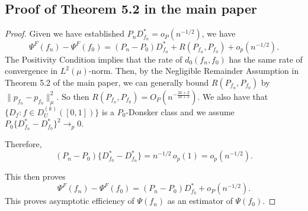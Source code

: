 \subsection{Proof of Theorem 5.2 in the main paper}
\begin{proof}
Given we have established $P_n D^*_{f_n}=o_P(n^{-1/2})$, we have
\[
\Psi^F(f_n)-\Psi^F(f_0)=(P_n-P_0)D^*_{f_n}+R(P_{f_n},P_{f_0})+o_p(n^{-1/2}).\]
The Positivity Condition implies that the rate of $d_0(f_n,f_0)$ has the same rate of convergence in $L^2(\mu)$-norm. Then, by the Negligible Remainder Assumption in Theorem 5.2 of the main paper, we can generally bound $R(P_{f_n},P_{f_0})$ by $\| p_{f_n}-p_{f_0}\|^2_{\mu}$.
So then $R(P_{f_n},P_{f_0})=O_P(n^{-\frac{2k+2}{2k+3}})$.
We also have that $\{D_f: f\in D^{(k)}_U([0,1])\}$ is a $P_0$-Donsker class and we assume 
$P_0\{D^*_{f_n}-D^*_{f_0}\}^2\rightarrow_p 0$. 

Therefore,
\[
(P_n - P_0)\{D^*_{f_0} - D^*_{f_n}\}
= n^{-1/2}\,o_p(1)
= o_p(n^{-1/2}).
\]

This then proves 
\[
\Psi^F(f_n)-\Psi^F(f_0)= (P_n - P_0)D^*_{f_0}+o_P(n^{-1/2}).\]
This proves asymptotic efficiency of $\Psi(f_n)$ as an estimator of $\Psi(f_0)$. 
\end{proof}

